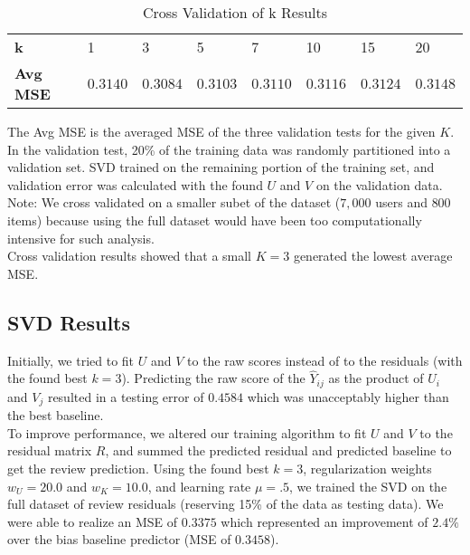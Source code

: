 \documentclass[12pt]{article}
\begin{document}
\begin{table}[ht!]
\centering
\caption{Cross Validation of k Results}
\vspace{2mm}
\begin{tabular}{llllllll}
\hline
\textbf{k}              & 1 				& 3          	& 5             & 7             & 10        & 15        & 20 \\
\textbf{Avg MSE}        & $0.3140$		& $0.3084$   	& $0.3103$      & $0.3110$      & $0.3116$  & $0.3124$  & $0.3148$\\ \hline
\end{tabular}
\end{table}

The Avg MSE is the averaged MSE of the three validation tests for the given $K$. In the validation test, 20\% of the training data was randomly partitioned into a validation set. SVD trained on the remaining portion of the training set, and validation error was calculated with the found $U$ and $V$ on the validation data. Note: We cross validated on a smaller subet of the dataset ($7,000$ users and $800$ items) because using the full dataset would have been too computationally intensive for such analysis.\\

 Cross validation results showed that a small $K = 3$ generated the lowest average MSE. \\

\subsection*{SVD Results}
Initially, we tried to fit $U$ and $V$ to the raw scores instead of to the residuals (with the found best $k = 3$). Predicting the raw score of the $\hat Y_{ij}$ as the product of $U_i$ and $V_j$ resulted in a testing error of $0.4584$ which was unacceptably higher than the best baseline. \\

To improve performance, we altered our training algorithm to fit $U$ and $V$ to the residual matrix $R$, and summed the predicted residual and predicted baseline to get the review prediction. Using the found best $k = 3$, regularization weights $w_U = 20.0$ and $w_K = 10.0$, and learning rate $\mu = .5$, we trained the SVD on the full dataset of review residuals (reserving 15\% of the data as testing data). We were able to realize an MSE of $0.3375$ which represented an improvement of $2.4\%$ over the bias baseline predictor (MSE of $0.3458$).
\end{document}
